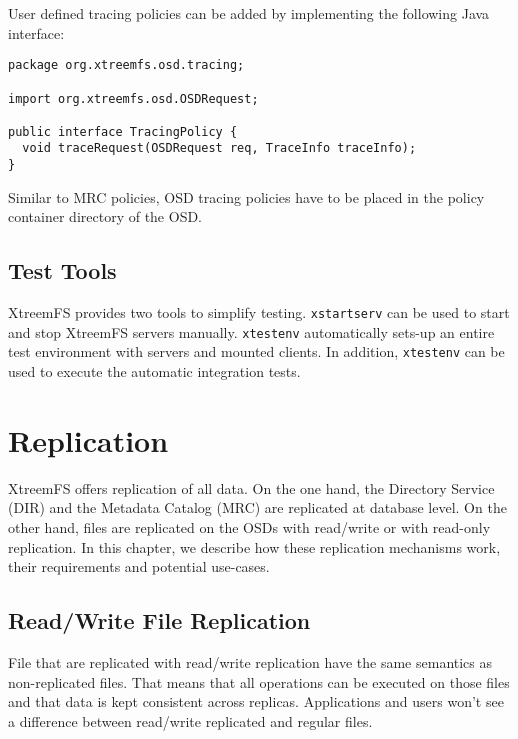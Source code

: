 \documentclass[a4paper,10pt]{book}
\begin{document}
User defined tracing policies can be added by implementing the following Java
interface:

\begin{verbatim}
package org.xtreemfs.osd.tracing;

import org.xtreemfs.osd.OSDRequest;

public interface TracingPolicy {
  void traceRequest(OSDRequest req, TraceInfo traceInfo);
}
\end{verbatim}

Similar to MRC policies, OSD tracing policies have to be placed in the policy
container directory of the OSD.

\section{Test Tools}
XtreemFS provides two tools to simplify testing. \texttt{xstartserv} can be used to start and stop XtreemFS servers manually. \texttt{xtestenv} automatically sets-up an entire test environment with servers and mounted clients. In addition, \texttt{xtestenv} can be used to execute the automatic integration tests.

\chapter{Replication}

XtreemFS offers replication of all data. On the one hand, the Directory Service (DIR) and the Metadata Catalog (MRC) are replicated at database level. On the other hand, files are replicated on the OSDs with read/write or with read-only replication. In this chapter, we describe how these replication mechanisms work, their requirements and potential use-cases.

\section{Read/Write File Replication}
\label{sec:readwrite_replication}
File that are replicated with read/write replication have the same semantics as non-replicated files. That means that all operations can be executed on those files and that data is kept consistent across replicas. Applications and users won't see a difference between read/write replicated and regular files.
\end{document}
